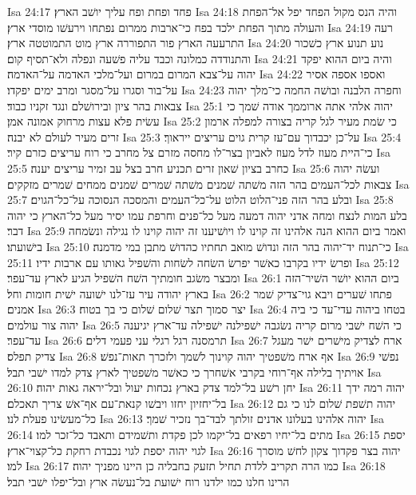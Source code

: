 Isa 24:17  פחד ופחת ופח עליך יושׁב הארץ׃
Isa 24:18  והיה הנס מקול הפחד יפל אל־הפחת והעולה מתוך הפחת ילכד בפח כי־ארבות ממרום נפתחו וירעשׁו מוסדי ארץ׃
Isa 24:19  רעה התרעעה הארץ פור התפוררה ארץ מוט התמוטטה ארץ׃
Isa 24:20  נוע תנוע ארץ כשׁכור והתנודדה כמלונה וכבד עליה פשׁעה ונפלה ולא־תסיף קום׃
Isa 24:21  והיה ביום ההוא יפקד יהוה על־צבא המרום במרום ועל־מלכי האדמה על־האדמה׃
Isa 24:22  ואספו אספה אסיר על־בור וסגרו על־מסגר ומרב ימים יפקדו׃
Isa 24:23  וחפרה הלבנה ובושׁה החמה כי־מלך יהוה צבאות בהר ציון ובירושׁלם ונגד זקניו כבוד׃
Isa 25:1  יהוה אלהי אתה ארוממך אודה שׁמך כי עשׂית פלא עצות מרחוק אמונה אמן׃
Isa 25:2  כי שׂמת מעיר לגל קריה בצורה למפלה ארמון זרים מעיר לעולם לא יבנה׃
Isa 25:3  על־כן יכבדוך עם־עז קרית גוים עריצים ייראוך׃
Isa 25:4  כי־היית מעוז לדל מעוז לאביון בצר־לו מחסה מזרם צל מחרב כי רוח עריצים כזרם קיר׃
Isa 25:5  כחרב בציון שׁאון זרים תכניע חרב בצל עב זמיר עריצים יענה׃
Isa 25:6  ועשׂה יהוה צבאות לכל־העמים בהר הזה משׁתה שׁמנים משׁתה שׁמרים שׁמנים ממחים שׁמרים מזקקים׃
Isa 25:7  ובלע בהר הזה פני־הלוט הלוט על־כל־העמים והמסכה הנסוכה על־כל־הגוים׃
Isa 25:8  בלע המות לנצח ומחה אדני יהוה דמעה מעל כל־פנים וחרפת עמו יסיר מעל כל־הארץ כי יהוה דבר׃
Isa 25:9  ואמר ביום ההוא הנה אלהינו זה קוינו לו ויושׁיענו זה יהוה קוינו לו נגילה ונשׂמחה בישׁועתו׃
Isa 25:10  כי־תנוח יד־יהוה בהר הזה ונדושׁ מואב תחתיו כהדושׁ מתבן במי מדמנה׃
Isa 25:11  ופרשׂ ידיו בקרבו כאשׁר יפרשׂ השׂחה לשׂחות והשׁפיל גאותו עם ארבות ידיו׃
Isa 25:12  ומבצר משׂגב חומתיך השׁח השׁפיל הגיע לארץ עד־עפר׃
Isa 26:1  ביום ההוא יושׁר השׁיר־הזה בארץ יהודה עיר עז־לנו ישׁועה ישׁית חומות וחל׃
Isa 26:2  פתחו שׁערים ויבא גוי־צדיק שׁמר אמנים׃
Isa 26:3  יצר סמוך תצר שׁלום שׁלום כי בך בטוח׃
Isa 26:4  בטחו ביהוה עדי־עד כי ביה יהוה צור עולמים׃
Isa 26:5  כי השׁח ישׁבי מרום קריה נשׂגבה ישׁפילנה ישׁפילה עד־ארץ יגיענה עד־עפר׃
Isa 26:6  תרמסנה רגל רגלי עני פעמי דלים׃
Isa 26:7  ארח לצדיק מישׁרים ישׁר מעגל צדיק תפלס׃
Isa 26:8  אף ארח משׁפטיך יהוה קוינוך לשׁמך ולזכרך תאות־נפשׁ׃
Isa 26:9  נפשׁי אויתיך בלילה אף־רוחי בקרבי אשׁחרך כי כאשׁר משׁפטיך לארץ צדק למדו ישׁבי תבל׃
Isa 26:10  יחן רשׁע בל־למד צדק בארץ נכחות יעול ובל־יראה גאות יהוה׃
Isa 26:11  יהוה רמה ידך בל־יחזיון יחזו ויבשׁו קנאת־עם אף־אשׁ צריך תאכלם׃
Isa 26:12  יהוה תשׁפת שׁלום לנו כי גם כל־מעשׂינו פעלת לנו׃
Isa 26:13  יהוה אלהינו בעלונו אדנים זולתך לבד־בך נזכיר שׁמך׃
Isa 26:14  מתים בל־יחיו רפאים בל־יקמו לכן פקדת ותשׁמידם ותאבד כל־זכר למו׃
Isa 26:15  יספת לגוי יהוה יספת לגוי נכבדת רחקת כל־קצוי־ארץ׃
Isa 26:16  יהוה בצר פקדוך צקון לחשׁ מוסרך למו׃
Isa 26:17  כמו הרה תקריב ללדת תחיל תזעק בחבליה כן היינו מפניך יהוה׃
Isa 26:18  הרינו חלנו כמו ילדנו רוח ישׁועת בל־נעשׂה ארץ ובל־יפלו ישׁבי תבל׃
